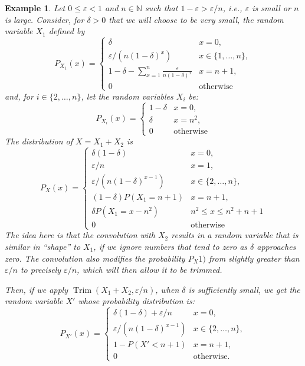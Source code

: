 \documentclass{article}
\newtheorem{example}{Example}
\DeclareMathOperator{\Trim}{Trim}
\begin{document}
\begin{example}\label{exp:seq}
	Let $0 {\leq} \varepsilon {<}1$ and $n {\in} \mathbb{N}$ such that $1{-}\varepsilon {>} {\varepsilon }/{n}$, i.e.,  
	$\varepsilon$ is small or $n$ is large. 
	Consider, for $\delta>0$ that we will choose to be very small, the random variable $X_1$ defined by
	$$
	P_{X_1}(x) {=} \begin{cases}
	\delta  & x=0, \\
	{\varepsilon }/{(n (1-\delta )^{x})} & x\in\{1,\dots,n\}, \\
	1{-}\delta{-}\sum_{x=1}^n \frac{\varepsilon }{n(1-\delta )^{x}} & x=n+1, \\
	0 & \text{otherwise}
	\end{cases}
	$$
	and, for $i\in\{2,\dots,n\}$, let the random variables $X_i$ be:
	$$
	P_{X_i}(x) =\begin{cases}
	1-\delta  & x=0, \\
	\delta     & x=n^2, \\
	0 & \text{otherwise}
	\end{cases}
	$$
	The distribution of $X=X_1+X_2$ is
	$$
	P_{X}(x) {=} 
	\begin{cases}
	\delta(1-\delta)  & x=0, \\
	{\varepsilon }/{n} & x=1, \\
	{\varepsilon }/{(n (1-\delta )^{x-1})} & x\in\{2,\dots,n\}, \\
	(1{-}\delta)P(X_1{=}n{+}1)& x=n+1, \\
	\delta P(X_1{=}x{-}n^2)& n^2 {\leq} x {\leq} n^2{+}n{+}1 \\
	0 & \text{otherwise}
	\end{cases}
	$$
	The idea here is that the convolution with $X_2$ results in a random variable that is similar in ``shape'' to $X_1$, 
	if we ignore numbers that tend to zero as $\delta$ approaches zero. The convolution also
	modifies the probability $P_{X}1)$ from slightly greater than  $\varepsilon/n$ to precisely $\varepsilon/n$, which will then allow it
	to be trimmed.
	
	Then, if we apply $\Trim(X_1+X_2,\varepsilon/n)$, when $\delta$ is sufficiently small, we get the random variable $X'$ whose probability distribution is:
	$$
	P_{X'}(x) {=} 
	\begin{cases}
	\delta(1-\delta)+{\varepsilon }/{n}  & x=0, \\
	{\varepsilon }/{(n (1-\delta )^{x-1})} & x\in\{2,\dots,n\}, \\
	1-P(X'{<}n+1)& x=n+1, \\
	0 & \text{otherwise.}
	\end{cases}
	$$ 
	

\end{example}
\end{document}
